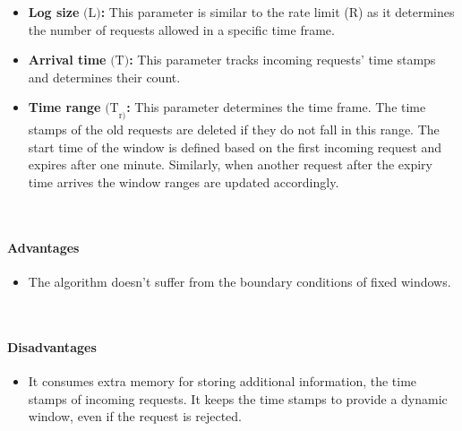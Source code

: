 \begin{itemize}
\item
\protect{}\label{l0w0f3pcNXPgPaEh5yaZZ}
\textbf{Log size} \protect{}\label{katex_inline_YwuL_UHvGEYy_agg8L-10}{{{\(\text{(L)}\)}}}\textbf{:} This parameter is similar to the rate limit (\protect{}\label{katex_inline_SX9al-owLiLO9mvKiysJh}{{{\(\text{R}\)}}}) as it determines the number of requests allowed in a specific time frame.
\item
\protect{}\label{qhcYswpTHHs4R6n47TQqo}
\textbf{Arrival time} \protect{}\label{katex_inline_40AKb6z_OddTq0d82OAEn}{{{\(\text{(T)}\)}}}\textbf{:} This parameter tracks incoming requests' time stamps and determines their count.
\item
\protect{}\label{5QAo5VIhqEBmzj1A39sTF}
\textbf{Time range} \protect{}\label{katex_inline_a0GZ6J0eNkl5j3enykJmq}{{{\(\text{(T}_\text{{r})}\)}}}\textbf{:} This parameter determines the time frame. The time stamps of the old requests are deleted if they do not fall in this range. The start time of the window is defined based on the first incoming request and expires after one minute. Similarly, when another request after the expiry time arrives the window ranges are updated accordingly.
\end{itemize}
\\
\paragraph{Advantages}\label{2Y_z1Sczrz_EkLAb4w4_5}

\begin{itemize}
\item
\protect{}\label{oC8jiwwA5g2pa95ZaRp3n}
The algorithm doesn't suffer from the boundary conditions of fixed windows.
\end{itemize}
\\
\paragraph{Disadvantages}\label{bwdPal1-F1X2zXWBfHRJZ}

\begin{itemize}
\item
\protect{}\label{fjYCxNJxISszFy5brs6wZ}
It consumes extra memory for storing additional information, the time stamps of incoming requests. It keeps the time stamps to provide a dynamic window, even if the request is rejected.
\end{itemize}

